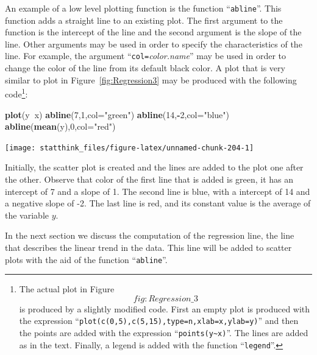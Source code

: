 \documentclass[]{krantz}
\makeatletter
\newenvironment{Shaded}{\begin{snugshade}}{\end{snugshade}}
\newcommand{\KeywordTok}[1]{\textcolor[rgb]{0.13,0.29,0.53}{\textbf{#1}}}
\newcommand{\DataTypeTok}[1]{\textcolor[rgb]{0.13,0.29,0.53}{#1}}
\newcommand{\DecValTok}[1]{\textcolor[rgb]{0.00,0.00,0.81}{#1}}
\newcommand{\StringTok}[1]{\textcolor[rgb]{0.31,0.60,0.02}{#1}}
\newcommand{\OperatorTok}[1]{\textcolor[rgb]{0.81,0.36,0.00}{\textbf{#1}}}
\newcommand{\NormalTok}[1]{#1}
\newenvironment{kframe}{%
\medskip{}
\setlength{\fboxsep}{.8em}
 \def\at@end@of@kframe{}%
 \ifinner\ifhmode%
  \def\at@end@of@kframe{\end{minipage}}%
  \begin{minipage}{\columnwidth}%
 \fi\fi%
 \def\FrameCommand##1{\hskip\@totalleftmargin \hskip-\fboxsep
 \colorbox{shadecolor}{##1}\hskip-\fboxsep
     \hskip-\linewidth \hskip-\@totalleftmargin \hskip\columnwidth}%
 \MakeFramed {\advance\hsize-\width
   \@totalleftmargin\z@ \linewidth\hsize
   \@setminipage}}%
 {\par\unskip\endMakeFramed%
 \at@end@of@kframe}
\renewenvironment{Shaded}{\begin{kframe}}{\end{kframe}}
\theoremstyle{definition}
\theoremstyle{definition}
\theoremstyle{definition}
\theoremstyle{remark}
\makeatother
\begin{document}
An example of a low level plotting function is the function
``\texttt{abline}''. This function adds a straight line to an existing
plot. The first argument to the function is the intercept of the line
and the second argument is the slope of the line. Other arguments may be
used in order to specify the characteristics of the line. For example,
the argument ``\texttt{col=}\emph{color.name}'' may be used in order to
change the color of the line from its default black color. A plot that
is very similar to plot in Figure~\ref{fig:Regression3} may be produced
with the following code\footnote{The actual plot in
  Figure~\[fig:Regression\_3\] is produced by a slightly modified code.
  First an empty plot is produced with the expression
  ``\texttt{plot(c(0,5),c(5,15),type=n,xlab=x,ylab=y)}'' and then the
  points are added with the expression
  ``\texttt{points(y\textasciitilde{}x)}''. The lines are added as in
  the text. Finally, a legend is added with the function
  ``\texttt{legend}''.}:

\begin{Shaded}
\begin{Highlighting}[]
\KeywordTok{plot}\NormalTok{(y}\OperatorTok{~}\NormalTok{x)}
\KeywordTok{abline}\NormalTok{(}\DecValTok{7}\NormalTok{,}\DecValTok{1}\NormalTok{,}\DataTypeTok{col=}\StringTok{"green"}\NormalTok{)}
\KeywordTok{abline}\NormalTok{(}\DecValTok{14}\NormalTok{,}\OperatorTok{-}\DecValTok{2}\NormalTok{,}\DataTypeTok{col=}\StringTok{"blue"}\NormalTok{)}
\KeywordTok{abline}\NormalTok{(}\KeywordTok{mean}\NormalTok{(y),}\DecValTok{0}\NormalTok{,}\DataTypeTok{col=}\StringTok{"red"}\NormalTok{)}
\end{Highlighting}
\end{Shaded}

\begin{center}\texttt{[image: statthink\_files/figure-latex/unnamed-chunk-204-1]} \end{center}

Initially, the scatter plot is created and the lines are added to the
plot one after the other. Observe that color of the first line that is
added is green, it has an intercept of 7 and a slope of 1. The second
line is blue, with a intercept of 14 and a negative slope of -2. The
last line is red, and its constant value is the average of the variable
\(y\).

In the next section we discuss the computation of the regression line,
the line that describes the linear trend in the data. This line will be
added to scatter plots with the aid of the function ``\texttt{abline}''.
\end{document}
